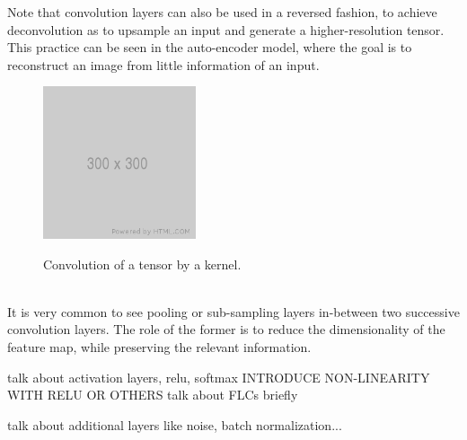 Note that convolution layers can also be used in a reversed fashion, to achieve
deconvolution as to upsample an input and generate a higher-resolution tensor.
This practice can be seen in the auto-encoder model, where the goal is to
reconstruct an image from little information of an input.

\begin{figure}[h]
	\center
	\includegraphics[width=0.4\textwidth]{figure/300x300.png}
	\label{fig:convolution}
	\caption{Convolution of a tensor by a kernel.}
\end{figure}


~\\It is very common to see pooling or sub-sampling layers in-between two
successive convolution layers. The role of the former is to reduce the
dimensionality of the feature map, while preserving the relevant information.


talk about activation layers, relu, softmax
INTRODUCE NON-LINEARITY WITH RELU OR OTHERS
talk about FLCs briefly

talk about additional layers like noise, batch normalization...
